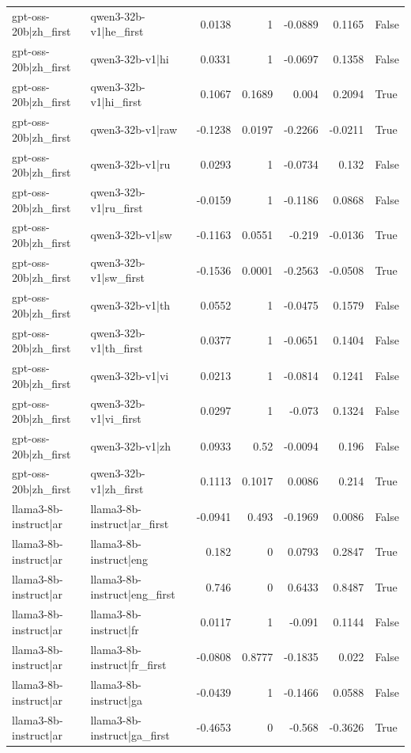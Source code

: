 \begin{table}
\begin{tabular}{l l r r r r l}
gpt-oss-20b|zh_first & qwen3-32b-v1|he_first & 0.0138 & 1 & -0.0889 & 0.1165 & False \\
gpt-oss-20b|zh_first & qwen3-32b-v1|hi & 0.0331 & 1 & -0.0697 & 0.1358 & False \\
gpt-oss-20b|zh_first & qwen3-32b-v1|hi_first & 0.1067 & 0.1689 & 0.004 & 0.2094 & True \\
gpt-oss-20b|zh_first & qwen3-32b-v1|raw & -0.1238 & 0.0197 & -0.2266 & -0.0211 & True \\
gpt-oss-20b|zh_first & qwen3-32b-v1|ru & 0.0293 & 1 & -0.0734 & 0.132 & False \\
gpt-oss-20b|zh_first & qwen3-32b-v1|ru_first & -0.0159 & 1 & -0.1186 & 0.0868 & False \\
gpt-oss-20b|zh_first & qwen3-32b-v1|sw & -0.1163 & 0.0551 & -0.219 & -0.0136 & True \\
gpt-oss-20b|zh_first & qwen3-32b-v1|sw_first & -0.1536 & 0.0001 & -0.2563 & -0.0508 & True \\
gpt-oss-20b|zh_first & qwen3-32b-v1|th & 0.0552 & 1 & -0.0475 & 0.1579 & False \\
gpt-oss-20b|zh_first & qwen3-32b-v1|th_first & 0.0377 & 1 & -0.0651 & 0.1404 & False \\
gpt-oss-20b|zh_first & qwen3-32b-v1|vi & 0.0213 & 1 & -0.0814 & 0.1241 & False \\
gpt-oss-20b|zh_first & qwen3-32b-v1|vi_first & 0.0297 & 1 & -0.073 & 0.1324 & False \\
gpt-oss-20b|zh_first & qwen3-32b-v1|zh & 0.0933 & 0.52 & -0.0094 & 0.196 & False \\
gpt-oss-20b|zh_first & qwen3-32b-v1|zh_first & 0.1113 & 0.1017 & 0.0086 & 0.214 & True \\
llama3-8b-instruct|ar & llama3-8b-instruct|ar_first & -0.0941 & 0.493 & -0.1969 & 0.0086 & False \\
llama3-8b-instruct|ar & llama3-8b-instruct|eng & 0.182 & 0 & 0.0793 & 0.2847 & True \\
llama3-8b-instruct|ar & llama3-8b-instruct|eng_first & 0.746 & 0 & 0.6433 & 0.8487 & True \\
llama3-8b-instruct|ar & llama3-8b-instruct|fr & 0.0117 & 1 & -0.091 & 0.1144 & False \\
llama3-8b-instruct|ar & llama3-8b-instruct|fr_first & -0.0808 & 0.8777 & -0.1835 & 0.022 & False \\
llama3-8b-instruct|ar & llama3-8b-instruct|ga & -0.0439 & 1 & -0.1466 & 0.0588 & False \\
llama3-8b-instruct|ar & llama3-8b-instruct|ga_first & -0.4653 & 0 & -0.568 & -0.3626 & True \\

\end{tabular}
\end{table}
